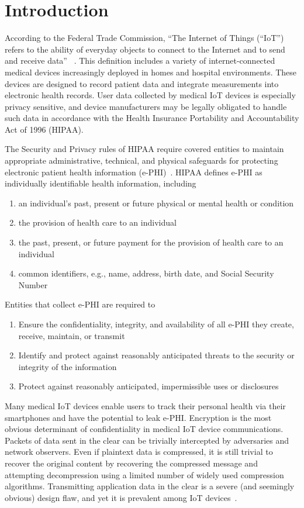 \section{Introduction}

According to the Federal Trade Commission, ``The Internet of Things (``IoT'') refers to the ability of everyday objects to connect to the Internet and to send and receive data'' ~\cite{ftc}. This definition includes a variety of internet-connected medical devices increasingly deployed in homes and hospital environments. These devices are designed to record patient data and integrate measurements into electronic health records. User data collected by medical IoT devices is especially privacy sensitive, and device manufacturers may be legally obligated to handle such data in accordance with the Health Insurance Portability and Accountability Act of 1996 (HIPAA). 

The Security and Privacy rules of HIPAA require covered entities to maintain appropriate administrative, technical, and physical safeguards for protecting electronic patient health information (e-PHI)~\cite{securityHIPAArule, privacyHIPAArule}. HIPAA defines e-PHI as individually identifiable health information, including
\begin{enumerate}
  \item an individual's past, present or future physical or mental health or condition
  \item the provision of health care to an individual
  \item the past, present, or future payment for the provision of health care to an individual
  \item common identifiers, e.g., name, address, birth date, and  Social Security Number
\end{enumerate}
Entities that collect e-PHI are required to 
\begin{enumerate}
  \item Ensure the confidentiality, integrity, and availability of all e-PHI they create, receive, maintain, or transmit
  \item Identify and protect against reasonably anticipated threats to the security or integrity of the information
  \item Protect against reasonably anticipated, impermissible uses or disclosures
\end{enumerate}

Many medical IoT devices enable users to track their personal health via their smartphones and have the potential to leak e-PHI. 
Encryption is the most obvious determinant of confidentiality in medical IoT device communications. Packets of data sent in the clear can be trivially intercepted by adversaries and network observers. Even if plaintext data is compressed, it is still trivial to recover the original content by recovering the compressed message and attempting decompression using a limited number of widely used compression algorithms. Transmitting application data in the clear is a severe (and seemingly obvious) design flaw, and yet it is prevalent among IoT devices~\cite{tinker}.

